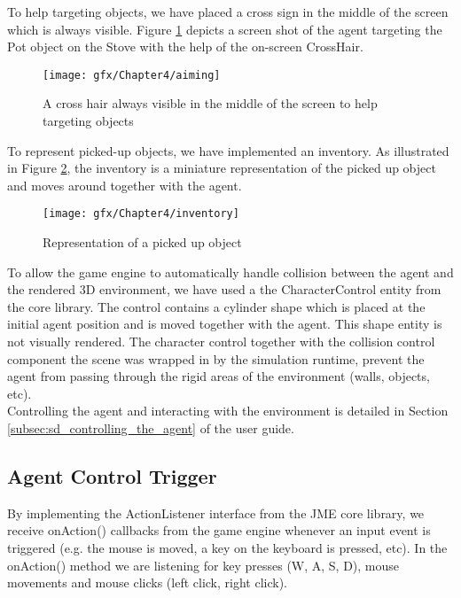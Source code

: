 To help targeting objects, we have placed a cross sign in the middle of the screen which is always visible. Figure \ref{fig:impl_crosshair} depicts a screen shot of the agent targeting the Pot object on the Stove with the help of the on-screen CrossHair.
\begin{figure}[H]
	\centering
	\texttt{[image: gfx/Chapter4/aiming]}
	\caption{A cross hair always visible in the middle of the screen to help targeting objects}
	\label{fig:impl_crosshair}
\end{figure}

To represent picked-up objects, we have implemented an inventory. As illustrated in Figure \ref{fig:impl_inventory}, the inventory is a miniature representation of the picked up object and moves around together with the agent.\\
\begin{figure}[H]
	\centering
	\texttt{[image: gfx/Chapter4/inventory]}
	\caption{Representation of a picked up object}
	\label{fig:impl_inventory}
\end{figure}

To allow the game engine to automatically handle collision between the agent and the rendered 3D environment, we have used a the CharacterControl entity from the core library. The control contains a cylinder shape which is placed at the initial agent position and is moved together with the agent. This shape entity is not visually rendered. The character control together with the collision control component the scene was wrapped in by the simulation runtime, prevent the agent from passing through the rigid areas of the environment (walls, objects, etc).\\

Controlling the agent and interacting with the environment is detailed in Section \ref{subsec:sd_controlling_the_agent} of the user guide.

\subsection{Agent Control Trigger} %
\label{subsec:impl_agent_control}
By implementing the ActionListener interface from the JME core library, we receive onAction() callbacks from the game engine whenever an input event is triggered (e.g. the mouse is moved, a key on the keyboard is pressed, etc). In the onAction() method we are listening for key presses (W, A, S, D), mouse movements and mouse clicks (left click, right click).\\

